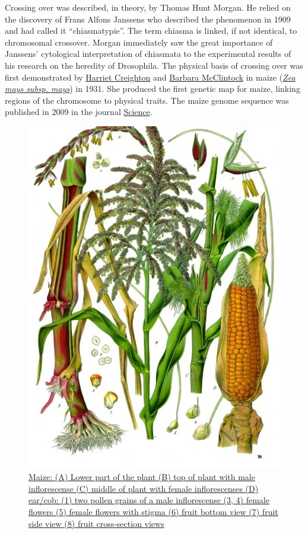 Crossing over was described, in theory, by Thomas Hunt Morgan. He relied on the discovery of Frans Alfons Janssens who described the phenomenon in 1909 and had called it ``chiasmatypie''. The term chiasma is linked, if not identical, to chromosomal crossover. Morgan immediately saw the great importance of Janssens' cytological interpretation of chiasmata to the experimental results of his research on the heredity of Drosophila. The physical basis of crossing over was first demonstrated by \href{https://en.wikipedia.org/wiki/Harriet_Creighton}{Harriet Creighton} and \href{https://en.wikipedia.org/wiki/Barbara_McClintock}{Barbara McClintock} in maize (\href{https://en.wikipedia.org/wiki/Maize}{\emph{Zea mays subsp. mays}}) in 1931. She produced the first genetic map for maize, linking regions of the chromosome to physical traits. The maize genome sequence was published in 2009 in the journal \href{https://science.sciencemag.org/content/326/5956/1112}{Science}.



\begin{figure}

{\centering \includegraphics[width=0.7\linewidth]{./figures/linkage/Zea_mays_-_Köhler–s_Medizinal-Pflanzen-283} 

}

\caption{\href{https://commons.wikimedia.org/wiki/File:Zea_mays_-_K\%C3\%B6hler\%E2\%80\%93s_Medizinal-Pflanzen-283.jpg}{Maize: (A) Lower part of the plant (B) top of plant with male inflorescense (C) middle of plant with female inflorescenses (D) ear/cob: (1) two pollen grains of a male inflorescense (3, 4) female flowers (5) female flowers with stigma (6) fruit bottom view (7) fruit side view (8) fruit cross-section views}}\label{fig:zeamays}
\end{figure}


